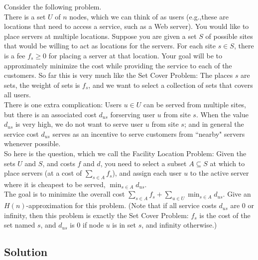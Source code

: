 \documentclass[a4paper]{article}
\newcommand{\nl}{\vspace{0.2cm}\\}
\begin{document}
Consider the following problem.\nl
There is a set $U$ of $n$ nodes,  which we can think of as users (e.g.,these are locations that need to access a service, such as a Web server).  You would like to place servers at  multiple
locations.   Suppose  you  are  given  a  set $S$ of  possible  sites  that  would  be  willing  to  act as  locations  for  the  servers.
For  each  site $s \in S$,  there  is  a  fee $f_s \ge 0$  for  placing  a  server  at  that location.
Your  goal  will  be  to  approximately  minimize  the  cost  while  providing  the  service  to  each of  the  customers.   So  far  this  is  very  much  like  the  Set  Cover  Problem:  The  places
$s$ are  sets,  the weight of sets is $f_s$, and we want to select a collection of sets that covers all users.\nl
There is one extra complication:  Users $u \in U$ can be served from multiple sites, but there is an associated cost $d_{us}$ forserving user $u$ from site $s$.  When the value $d_{us}$ is very high,
we do not want to serve user $u$ from site $s$; and in general the service cost $d_{us}$ serves as an incentive to serve customers from ``nearby" servers whenever possible.\nl
So here is the question, which we call the Facility Location Problem:  Given the sets $U$ and $S$, and costs $f$ and $d$, you need to select a subset $A \subseteq S$ at which to place servers (at a
cost of $\sum_{s\in A} f_s$), and assign each user $u$ to the active server where it is cheapest to be served, $\min_{s \in A} d_{us}$.\nl
The goal is to minimize the overall cost $\sum_{s\in A} f_s + \sum_{u \in U} \min_{s \in A} d_{us}$.  Give an $H(n)$-approximation for this problem.
(Note that if all service costs $d_{us}$ are 0 or infinity, then this problem is exactly the Set Cover Problem: $f_s$ is the cost of the set named $s$, and $d_{us}$ is 0 if node $u$ is in set
$s$, and infinity otherwise.)

\subsection{Solution}
\end{document}
